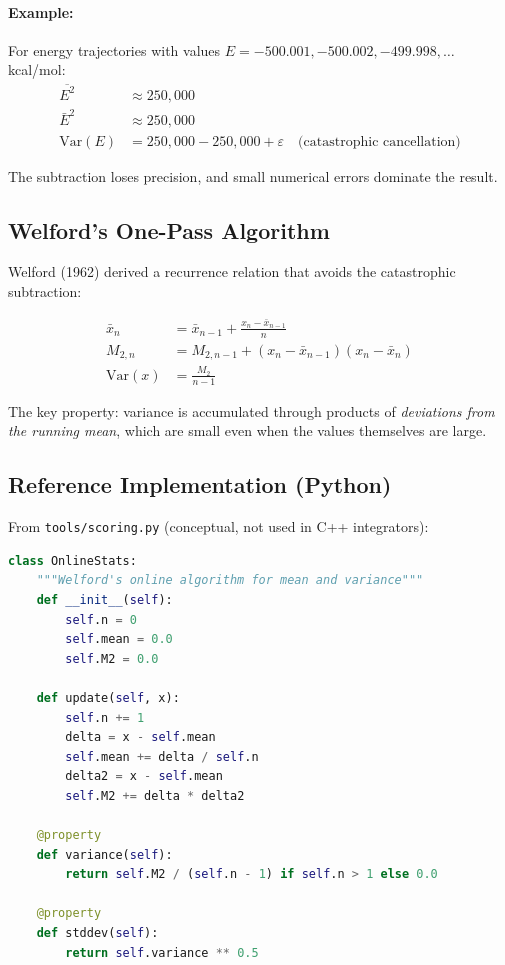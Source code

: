 \documentclass[11pt]{article}
\begin{document}
\paragraph{Example:} For energy trajectories with values $E = -500.001, -500.002, -499.998, \ldots$ kcal/mol:
\begin{align}
\overline{E^2} &\approx 250{,}000 \\
\bar{E}^2 &\approx 250{,}000 \\
\text{Var}(E) &= 250{,}000 - 250{,}000 + \varepsilon \quad \text{(catastrophic cancellation)}
\end{align}

The subtraction loses precision, and small numerical errors dominate the result.

\subsection{Welford's One-Pass Algorithm}

Welford (1962) derived a recurrence relation that avoids the catastrophic subtraction:

\begin{align}
\bar{x}_n &= \bar{x}_{n-1} + \frac{x_n - \bar{x}_{n-1}}{n} \label{eq:welford_mean} \\
M_{2,n} &= M_{2,n-1} + (x_n - \bar{x}_{n-1})(x_n - \bar{x}_n) \label{eq:welford_m2} \\
\text{Var}(x) &= \frac{M_2}{n-1} \label{eq:welford_var}
\end{align}

The key property: variance is accumulated through products of \textit{deviations from the running mean}, which are small even when the values themselves are large.

\subsection{Reference Implementation (Python)}

From \texttt{tools/scoring.py} (conceptual, not used in C++ integrators):

\begin{lstlisting}[language=Python]
class OnlineStats:
    """Welford's online algorithm for mean and variance"""
    def __init__(self):
        self.n = 0
        self.mean = 0.0
        self.M2 = 0.0
    
    def update(self, x):
        self.n += 1
        delta = x - self.mean
        self.mean += delta / self.n
        delta2 = x - self.mean
        self.M2 += delta * delta2
    
    @property
    def variance(self):
        return self.M2 / (self.n - 1) if self.n > 1 else 0.0
    
    @property
    def stddev(self):
        return self.variance ** 0.5
\end{lstlisting}
\end{document}
